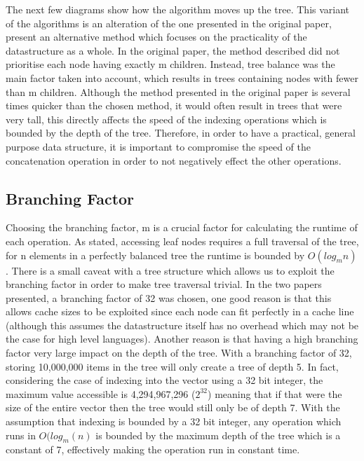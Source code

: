 \documentclass[11pt,a4paper,oneside]{article}
\begin{document}
The next few diagrams show how the algorithm moves up the tree. This variant of the algorithms is an alteration of the one presented in the original paper\citep{bagwell2011rrb}, \cite{stucki2015rrb} present an alternative method which focuses on the practicality of the datastructure as a whole. In the original paper, the method described did not prioritise each node having exactly m children. Instead, tree balance was the main factor taken into account, which results in trees containing nodes with fewer than m children. Although the method presented in the original paper is several times quicker than the chosen method, it would often result in trees that were very tall, this directly affects the speed of the indexing operations which is bounded by the depth of the tree. Therefore, in order to have a practical, general purpose data structure, it is important to compromise the speed of the concatenation operation in order to not negatively effect the other operations.

\subsection{Branching Factor}

Choosing the branching factor, m is a crucial factor for calculating the runtime of each operation. As stated, accessing leaf nodes requires a full traversal of the tree, for n elements in a perfectly balanced tree the runtime is bounded by $O(log_m n)$. There is a small caveat with a tree structure which allows us to exploit the branching factor in order to make tree traversal trivial. In the two papers presented, a branching factor of 32 was chosen, one good reason is that this allows cache sizes to be exploited since each node can fit perfectly in a cache line\citep{stucki2015rrb} (although this assumes the datastructure itself has no overhead which may not be the case for high level languages). Another reason is that having a high branching factor very large impact on the depth of the tree. With a branching factor of 32, storing 10,000,000 items in the tree will only create a tree of depth 5. In fact, considering the case of indexing into the vector using a 32 bit integer, the maximum value accessible is 4,294,967,296 ($2^{32}$) meaning that if that were the size of the entire vector then the tree would still only be of depth 7. With the assumption that indexing is bounded by a 32 bit integer, any operation which runs in $O(log_m(n)$ is bounded by the maximum depth of the tree which is a constant of 7, effectively making the operation run in constant time\citep{bagwell2011rrb}.
\end{document}
